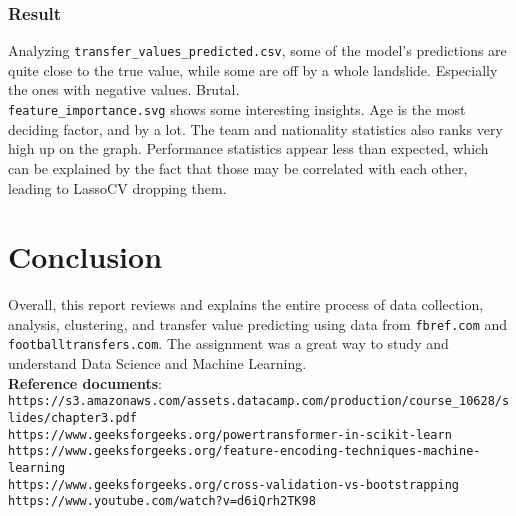 \documentclass{report}
\begin{document}
\subsubsection{Result}
Analyzing \verb|transfer_values_predicted.csv|, some of the model's predictions are quite close to
the true value, while some are off by a whole landslide. Especially the ones with negative values. 
Brutal. \\
\verb|feature_importance.svg| shows some interesting insights. Age is the most deciding factor, and
by a lot. The team and nationality statistics also ranks very high up on the graph. Performance 
statistics appear less than expected, which can be explained by the fact that those may be correlated 
with each other, leading to LassoCV dropping them.

\section{Conclusion}
Overall, this report reviews and explains the entire process of data collection, analysis, clustering, and 
transfer value predicting using data from \verb|fbref.com| and \verb|footballtransfers.com|. 
The assignment was a great way to study and understand Data Science and Machine Learning. \\

\textbf{Reference documents}: \\
{\small \verb|https://s3.amazonaws.com/assets.datacamp.com/production/course_10628/slides/chapter3.pdf|} \\
{\small \verb|https://www.geeksforgeeks.org/powertransformer-in-scikit-learn|} \\ 
{\small \verb|https://www.geeksforgeeks.org/feature-encoding-techniques-machine-learning|} \\
{\small \verb|https://www.geeksforgeeks.org/cross-validation-vs-bootstrapping|} \\
{\small \verb|https://www.youtube.com/watch?v=d6iQrh2TK98|} \\
\end{document}
